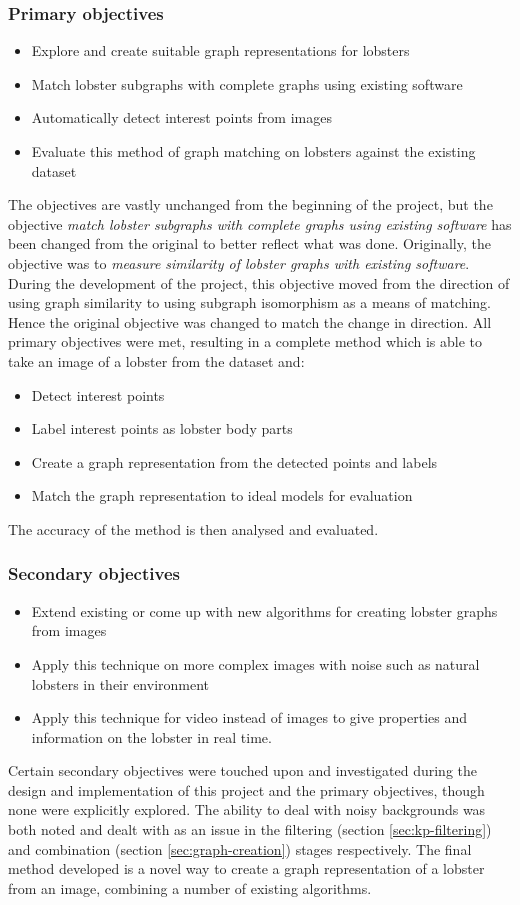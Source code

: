 \subsubsection{Primary objectives}
\begin{itemize}
\item Explore and create suitable graph representations for lobsters
\item Match lobster subgraphs with complete graphs using existing software
\item Automatically detect interest points from images
\item Evaluate this method of graph matching on lobsters against the existing dataset
\end{itemize}
The objectives are vastly unchanged from the beginning of the project, but the objective \textit{match lobster subgraphs with complete graphs using existing software} has been changed from the original to better reflect what was done. Originally, the objective was to \textit{measure similarity of lobster graphs with existing software}. During the development of the project, this objective moved from the direction of using graph similarity to using subgraph isomorphism as a means of matching. Hence the original objective was changed to match the change in direction. 
\n
All primary objectives were met, resulting in a complete method which is able to take an image of a lobster from the dataset and:
\begin{itemize}
\item Detect interest points
\item Label interest points as lobster body parts
\item Create a graph representation from the detected points and labels
\item Match the graph representation to ideal models for evaluation
\end{itemize} 
The accuracy of the method is then analysed and evaluated. 
 
\subsubsection{Secondary objectives}
\begin{itemize}
\item Extend existing or come up with new algorithms for creating lobster graphs from images
\item Apply this technique on more complex images with noise such as natural lobsters in their environment
\item Apply this technique for video instead of images to give properties and information on the lobster in real time. 
\end{itemize}
Certain secondary objectives were touched upon and investigated during the design and implementation of this project and the primary objectives, though none were explicitly explored. The ability to deal with noisy backgrounds was both noted and dealt with as an issue in the filtering (section \ref{sec:kp-filtering}) and combination (section \ref{sec:graph-creation}) stages respectively. The final method developed is a novel way to create a graph representation of a lobster from an image, combining a number of existing algorithms. 

